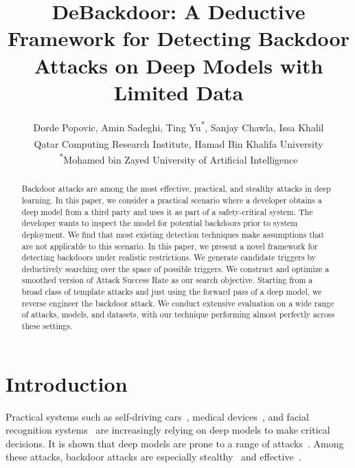 \documentclass[letterpaper,twocolumn,10pt]{article}
\newcommand{\Z}{\textbf{DeBackdoor}}
\begin{document}
\date{}

\title{\Large \bf \Z: A Deductive Framework for Detecting Backdoor Attacks on Deep Models with Limited Data}

\author{
 {\rm Dorde Popovic\textsuperscript{\dag}, Amin Sadeghi\textsuperscript{\dag}, Ting Yu\textsuperscript{*}, Sanjay Chawla\textsuperscript{\dag}, Issa Khalil\textsuperscript{\dag}}\\
 \textsuperscript{\dag}Qatar Computing Research Institute, Hamad Bin Khalifa University\\
 \textsuperscript{*}Mohamed bin Zayed University of Artificial Intelligence
} 
\maketitle

\begin{abstract}
Backdoor attacks are among the most effective, practical, and stealthy attacks in deep learning. In this paper, we consider a practical scenario where a developer obtains a deep model from a third party and uses it as part of a safety-critical system. The developer wants to inspect the model for potential backdoors prior to system deployment. We find that most existing detection techniques make assumptions that are not applicable to this scenario. In this paper, we present a novel framework for detecting backdoors under realistic restrictions. We generate candidate triggers by deductively searching over the space of possible triggers. We construct and optimize a smoothed version of Attack Success Rate as our search objective. Starting from a broad class of template attacks and just using the forward pass of a deep model, we reverse engineer the backdoor attack. We conduct extensive evaluation on a wide range of attacks, models, and datasets, with our technique performing almost perfectly across these settings.


\end{abstract}


\section{Introduction}
\label{sec:introduction}

Practical systems such as self-driving cars~\cite{bojarski2016cars}, medical devices~\cite{esteva2017dermatologist}, and facial recognition systems~\cite{kortli2020facial} are increasingly relying on deep models to make critical decisions. It is shown that deep models are prone to a range of attacks~\cite{barreno2010security, li2022survey}. Among these attacks, backdoor attacks are especially stealthy~\cite{gu2017badnets} and effective~\cite{chen2020cloud, pajola2021giants}.
\end{document}
